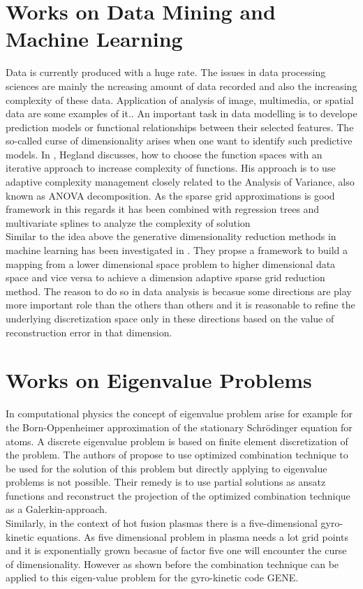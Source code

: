 \section{Works on Data Mining and Machine Learning}
Data is currently produced with a huge rate. The issues in data processing sciences are mainly the ncreasing amount of data recorded and also the increasing complexity of these data. Application of analysis of image, multimedia, or spatial data are some examples of it.. An important task in data modelling is to develope prediction models or functional relationships between their selected features. The so-called curse of dimensionality arises when one want to identify such predictive models. In \cite{Hegland2003}, Hegland discusses, how to choose the function spaces with an iterative approach to increase complexity of functions. His approach is to use adaptive complexity management closely related to the Analysis of Variance, also known as ANOVA decomposition. As the sparse grid approximations is good framework in this regards it has been combined with regression trees and multivariate splines to analyze the complexity of solution\\
Similar to the idea above the generative dimensionality reduction methods in machine learning has been investigated in \cite{Bohn2016}. They propse a framework to build a  mapping from a lower dimensional space problem to higher dimensional data space and vice versa to achieve a dimension adaptive sparse grid reduction method. The reason to do so in data analysis is becasue some directions are play more important role than the others than others and it is reasonable to refine the underlying discretization space only in these directions based on the value of reconstruction error in that dimension.\\
\section{Works on Eigenvalue Problems}
In computational physics the concept of eigenvalue problem arise for example for the Born-Oppenheimer approximation of the stationary Schr\"odinger equation for atoms. A discrete eigenvalue problem is based on finite element discretization of the problem. The authors of \cite{Garcke2007} propose to use optimized combination technique to be used for the solution of this problem but directly applying to eigenvalue problems is not possible. Their remedy is to use partial solutions as ansatz functions and reconstruct the projection of the optimized combination technique as a Galerkin-approach\cite{Garcke2007}.\\
Similarly, in the context of hot fusion plasmas there is a five-dimensional gyro-kinetic equations. As five dimensional problem in plasma needs a lot grid points and it is exponentially grown becasue of factor five one will encounter the curse of dimensionality. However as shown before the combination technique can be applied to this eigen-value problem for the gyro-kinetic code GENE\cite{Kowitz2013}.
